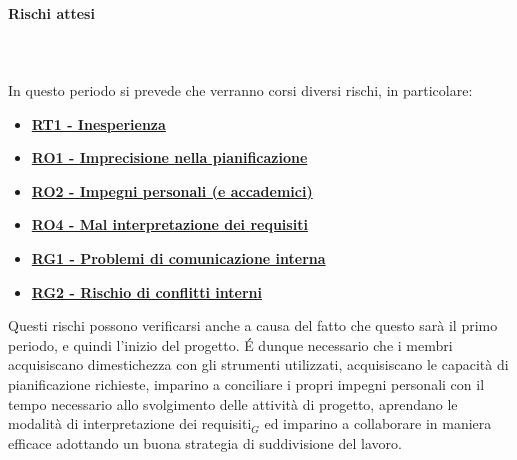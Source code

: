 \paragraph{Rischi attesi} \hspace{1cm}
\\ \hspace{1cm} \\
In questo periodo si prevede che verranno corsi diversi rischi, in particolare:
\begin{itemize}
    \item \textbf{\hyperlink{RT1}{RT1 - Inesperienza}}
    \item \textbf{\hyperlink{RO1}{RO1 - Imprecisione nella pianificazione}}
    \item \textbf{\hyperlink{RO2}{RO2 - Impegni personali (e accademici)}}
    \item \textbf{\hyperlink{RO4}{RO4 - Mal interpretazione dei requisiti}}
    \item \textbf{\hyperlink{RG1}{RG1 - Problemi di comunicazione interna}}
    \item \textbf{\hyperlink{RG2}{RG2 - Rischio di conflitti interni}}
\end{itemize}
Questi rischi possono verificarsi anche a causa del fatto che questo sarà il primo periodo, e quindi l'inizio del progetto. \'E dunque necessario che i membri acquisiscano dimestichezza con gli strumenti utilizzati, acquisiscano le capacità di pianificazione richieste, imparino a conciliare i propri impegni personali con il tempo necessario allo svolgimento delle attività di progetto, aprendano le modalità di interpretazione dei requisiti$_G$ ed imparino a collaborare in maniera efficace adottando un buona strategia di suddivisione del lavoro.
